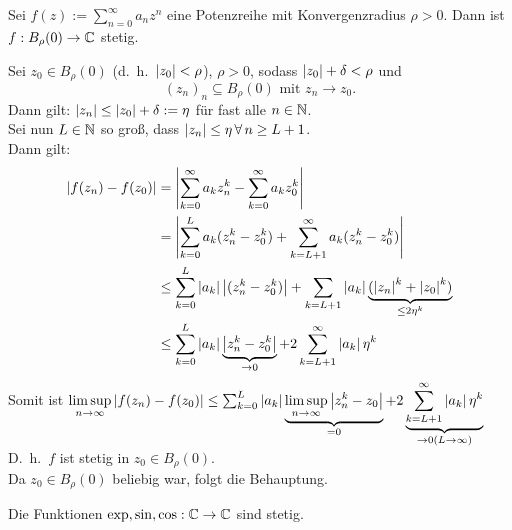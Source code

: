 \documentclass[../ana1.tex]{subfiles}
\begin{document}
\begin{satz}
    Sei \( f(z) := \sum_{n=0}^\infty a_n z^n \) eine 
    Potenzreihe mit Konvergenzradius \( \rho > 0 \). 
    Dann ist \( f: B_\rho(0) \rightarrow \mathbb{C} \) stetig.
\end{satz}
\begin{bew}
    Sei \( z_0 \in B_\rho(0) \) (d.\ h.\  \( \left|z_0\right| < \rho \)),
    \( \rho > 0 \), sodass \( \left|z_0\right| + \delta < \rho \) und
    \[ {(z_n)}_n \subseteq B_\rho(0) \text{ mit } z_n 
    \rightarrow z_0. \]
    Dann gilt: \( \left|z_n\right| \leq \left|z_0\right| + \delta := \eta \) 
    für fast alle \(n\in\mathbb{N} \).\\
    Sei nun \( L\in\mathbb{N} \) so groß, dass \( \left|z_n\right| \leq \eta 
    \,\forall \, n \geq L + 1 \).\\
    Dann gilt:
    \begin{align*}
        \left|f(z_n) - f(z_0)\right| &= \left| \sum_{k=0}^\infty a_k z_n^k - \sum_{k=0}^\infty a_k z_0^k \right|\\
        &= \left| \sum_{k=0}^L a_k(z_n^k - z_0^k) + \sum_{k=L+1}^\infty a_k(z_n^k - z_0^k) \right|\\
        &\leq \sum_{k=0}^L \left|a_k\right| \left|(z_n^k - z_0^k)\right| + \sum_{k=L+1} \left|a_k\right| \underbrace{( \left|z_n\right|^k + \left|z_0\right|^k )}_{\leq 2 \eta^k}\\
        &\leq \sum_{k=0}^L \left|a_k\right| \underbrace{\left| z_n^k - z_0^k \right|}_{\rightarrow 0} + 2 \sum_{k=L+1}^\infty \left|a_k\right| \eta^k
    \end{align*}
    Somit ist \( \limsup\limits_{n\rightarrow\infty} \left|f(z_n) 
    - f(z_0)\right| \leq \sum_{k=0}^L \left|a_k\right| 
    \underbrace{\limsup\limits_{n\rightarrow\infty} \left|z_n^k - z_0\right|}_{=0} 
    + 2 \underbrace{\sum_{k=L+1}^\infty \left|a_k\right| \eta^k}_{
        \rightarrow 0 (L\rightarrow \infty)} \) \\
    D.\ h.\  \(f\) ist stetig in \( z_0 \in B_\rho(0) \).\\
    Da \( z_0 \in B_\rho(0) \) beliebig war, 
    folgt die Behauptung.
\end{bew}
\begin{kor}
    Die Funktionen \( \exp, \sin, \cos : 
    \mathbb{C} \rightarrow \mathbb{C} \) sind stetig.
\end{kor}
\end{document}
